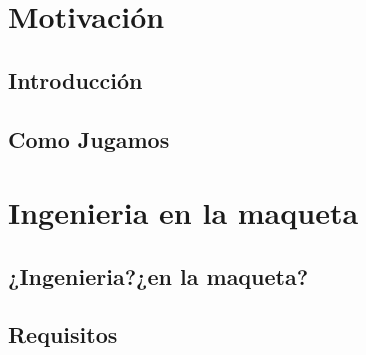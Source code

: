 \documentclass[11pt,fleqn]{book} %
\begin{document}



\pagestyle{empty} %
\tableofcontents %

\cleardoublepage %

\pagestyle{fancy} %


\part{Motivación}


\chapter{Introducción}


\chapter{Como Jugamos}


\part{Ingenieria en la maqueta}
\chapter{¿Ingenieria?¿en la maqueta?}

\chapter{Requisitos}

\end{document}
